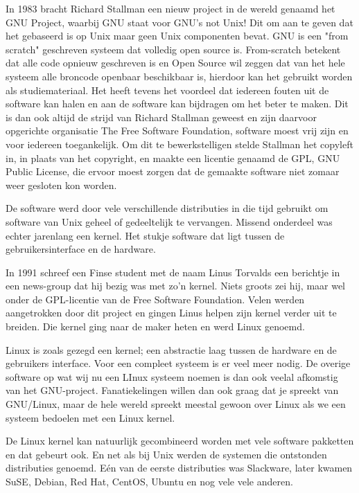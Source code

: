 In 1983 bracht Richard Stallman een nieuw project in de wereld genaamd het GNU Project, waarbij GNU staat
voor GNU's not Unix! Dit om aan te geven dat het gebaseerd is op Unix maar geen Unix componenten bevat. GNU is een "from
scratch" geschreven systeem dat volledig open source is. From-scratch betekent dat alle code opnieuw geschreven is en Open Source wil zeggen dat van het hele systeem alle broncode openbaar
beschikbaar is, hierdoor kan het gebruikt worden als studiemateriaal. Het heeft tevens het voordeel dat iedereen fouten
uit de software kan halen en aan de software kan bijdragen om het beter te maken. Dit is dan ook altijd de strijd van
Richard Stallman geweest en zijn daarvoor opgerichte organisatie The Free Software
Foundation, software moest vrij zijn en voor iedereen toegankelijk. Om dit te bewerkstelligen stelde Stallman het
copyleft in, in plaats van het copyright, en maakte een licentie genaamd de GPL, GNU Public
License, die ervoor moest zorgen dat de gemaakte software niet zomaar weer gesloten kon worden.\par

De software werd door vele verschillende distributies in die tijd gebruikt om software van Unix geheel of gedeeltelijk
te vervangen. Missend onderdeel was echter jarenlang een kernel. Het stukje software dat ligt tussen de
gebruikersinterface en de hardware.\par

In 1991 schreef een Finse student met de naam Linus Torvalds een berichtje in een news-group dat hij bezig was met zo'n
kernel. Niets groots zei hij, maar wel onder de GPL-licentie van de Free Software Foundation. Velen werden aangetrokken
door dit project en gingen Linus helpen zijn kernel verder uit te breiden. Die kernel ging naar de maker heten en werd
Linux genoemd.\par

Linux is zoals gezegd een kernel; een abstractie laag tussen de hardware en de gebruikers interface. Voor een compleet systeem is er veel meer nodig. De overige software op wat wij nu een LInux systeem noemen is dan ook veelal afkomstig van het
GNU-project. Fanatiekelingen willen dan ook graag dat je spreekt van GNU/Linux, maar de hele wereld
spreekt meestal gewoon over Linux als we een systeem bedoelen met een Linux kernel.\par

De Linux kernel kan natuurlijk gecombineerd worden met vele software pakketten en dat gebeurt ook. En net als bij
Unix werden de systemen die ontstonden distributies genoemd. E\'en van de eerste distributies was Slackware, later
kwamen SuSE, Debian, Red Hat, CentOS, Ubuntu en nog vele vele anderen.\par

